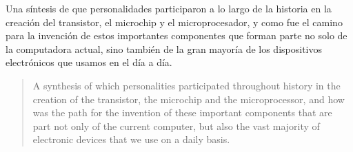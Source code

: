 \begin{resumen}
	Una síntesis de que personalidades participaron a lo largo de la historia en la
	creación del transistor, el microchip y el microprocesador, y como fue el camino
	para la invención de estos importantes componentes que forman parte no solo de la
	computadora actual, sino también de la gran mayoría de los dispositivos electrónicos
	que usamos en el día a día. 
\end{resumen}

\begin{abstract}
	A synthesis of which personalities participated throughout history in the
	creation of the transistor, the microchip and the microprocessor, and how was the path
	for the invention of these important components that are part not only of the
	current computer, but also the vast majority of electronic devices
	that we use on a daily basis.
\end{abstract}

